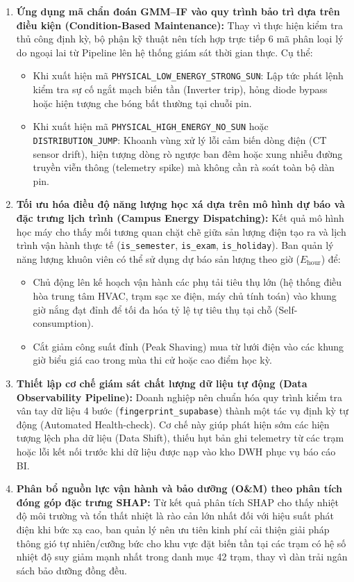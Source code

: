 \documentclass[12pt, a4paper]{report}
\begin{document}
\begin{enumerate}
    \item \textbf{Ứng dụng mã chẩn đoán GMM--IF vào quy trình bảo trì dựa trên điều kiện (Condition-Based Maintenance):} 
    Thay vì thực hiện kiểm tra thủ công định kỳ, bộ phận kỹ thuật nên tích hợp trực tiếp 6 mã phân loại lý do ngoại lai từ Pipeline lên hệ thống giám sát thời gian thực. Cụ thể:
    \begin{itemize}
        \item Khi xuất hiện mã \texttt{PHYSICAL\_LOW\_ENERGY\_STRONG\_SUN}: Lập tức phát lệnh kiểm tra sự cố ngắt mạch biến tần (Inverter trip), hỏng diode bypass hoặc hiện tượng che bóng bất thường tại chuỗi pin.
        \item Khi xuất hiện mã \texttt{PHYSICAL\_HIGH\_ENERGY\_NO\_SUN} hoặc \texttt{DISTRIBUTION\_JUMP}: Khoanh vùng xử lý lỗi cảm biến dòng điện (CT sensor drift), hiện tượng dòng rò ngược ban đêm hoặc xung nhiễu đường truyền viễn thông (telemetry spike) mà không cần rà soát toàn bộ dàn pin.
    \end{itemize}

    \item \textbf{Tối ưu hóa điều độ năng lượng học xá dựa trên mô hình dự báo và đặc trưng lịch trình (Campus Energy Dispatching):} 
    Kết quả mô hình học máy cho thấy mối tương quan chặt chẽ giữa sản lượng điện tạo ra và lịch trình vận hành thực tế (\texttt{is\_semester}, \texttt{is\_exam}, \texttt{is\_holiday}). Ban quản lý năng lượng khuôn viên có thể sử dụng dự báo sản lượng theo giờ ($E_{\text{hour}}$) để:
    \begin{itemize}
        \item Chủ động lên kế hoạch vận hành các phụ tải tiêu thụ lớn (hệ thống điều hòa trung tâm HVAC, trạm sạc xe điện, máy chủ tính toán) vào khung giờ nắng đạt đỉnh để tối đa hóa tỷ lệ tự tiêu thụ tại chỗ (Self-consumption).
        \item Cắt giảm công suất đỉnh (Peak Shaving) mua từ lưới điện vào các khung giờ biểu giá cao trong mùa thi cử hoặc cao điểm học kỳ.
    \end{itemize}

    \item \textbf{Thiết lập cơ chế giám sát chất lượng dữ liệu tự động (Data Observability Pipeline):} 
    Doanh nghiệp nên chuẩn hóa quy trình kiểm tra vân tay dữ liệu 4 bước (\texttt{fingerprint\_supabase}) thành một tác vụ định kỳ tự động (Automated Health-check). Cơ chế này giúp phát hiện sớm các hiện tượng lệch pha dữ liệu (Data Shift), thiếu hụt bản ghi telemetry từ các trạm hoặc lỗi kết nối trước khi dữ liệu được nạp vào kho DWH phục vụ báo cáo BI.

    \item \textbf{Phân bổ nguồn lực vận hành và bảo dưỡng (O\&M) theo phân tích đóng góp đặc trưng SHAP:} 
    Từ kết quả phân tích SHAP cho thấy nhiệt độ môi trường và tổn thất nhiệt là rào cản lớn nhất đối với hiệu suất phát điện khi bức xạ cao, ban quản lý nên ưu tiên kinh phí cải thiện giải pháp thông gió tự nhiên/cưỡng bức cho khu vực đặt biến tần tại các trạm có hệ số nhiệt độ suy giảm mạnh nhất trong danh mục 42 trạm, thay vì dàn trải ngân sách bảo dưỡng đồng đều.
\end{enumerate}
\end{document}

